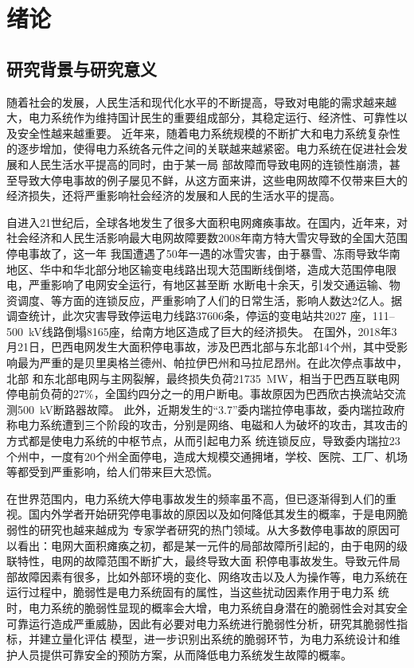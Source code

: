 \chapter{绪论}

\section{研究背景与研究意义}
\label{sec:research_background}
随着社会的发展，人民生活和现代化水平的不断提高，导致对电能的需求越来越大，电力系统作为维持国计民生的重要组成部分，其稳定运行、经济性、可靠性以及安全性越来越重要。
近年来，随着电力系统规模的不断扩大和电力系统复杂性的逐步增加，使得电力系统各元件之间的关联越来越紧密。电力系统在促进社会发展和人民生活水平提高的同时，由于某一局
部故障而导致电网的连锁性崩溃，甚至导致大停电事故的例子屡见不鲜，从这方面来讲，这些电网故障不仅带来巨大的经济损失，还将严重影响社会经济的发展和人民的生活水平的提高。

自进入21世纪后，全球各地发生了很多大面积电网瘫痪事故。在国内，近年来，对社会经济和人民生活影响最大电网故障要数2008年南方特大雪灾导致的全国大范围停电事故了，这一年
我国遭遇了50年一遇的冰雪灾害，由于暴雪、冻雨导致华南地区、华中和华北部分地区输变电线路出现大范围断线倒塔，造成大范围停电限电，严重影响了电网安全运行，有地区甚至断
水断电十余天，引发交通运输、物资调度、等方面的连锁反应，严重影响了人们的日常生活，影响人数达2亿人。据调查统计，此次灾害导致停运电力线路37606条，停运的变电站共2027
座，111--500~kV线路倒塌8165座，给南方地区造成了巨大的经济损失。
在国外，2018年3月21日，巴西电网发生大面积停电事故，涉及巴西北部与东北部14个州，其中受影响最为严重的是贝里奥格兰德州、帕拉伊巴州和马拉尼昂州。在此次停点事故中，北部
和东北部电网与主网裂解，最终损失负荷21735~MW，相当于巴西互联电网停电前负荷的27\%，全国约四分之一的用户断电。事故原因为巴西欣古换流站交流测500~kV断路器故障\cite{refs1}。
此外，近期发生的“3.7”委内瑞拉停电事故，委内瑞拉政府称电力系统遭到三个阶段的攻击，分别是网络、电磁和人为破坏的攻击，其攻击的方式都是使电力系统的中枢节点，从而引起电力系
统连锁反应，导致委内瑞拉23个州中，一度有20个州全面停电，造成大规模交通拥堵，学校、医院、工厂、机场等都受到严重影响，给人们带来巨大恐慌。

在世界范围内，电力系统大停电事故发生的频率虽不高，但已逐渐得到人们的重视。国内外学者开始研究停电事故的原因以及如何降低其发生的概率，于是电网脆弱性的研究也越来越成为
专家学者研究的热门领域。从大多数停电事故的原因可以看出：电网大面积瘫痪之初，都是某一元件的局部故障所引起的，由于电网的级联特性，电网的故障范围不断扩大，最终导致大面
积停电事故发生。导致元件局部故障因素有很多，比如外部环境的变化、网络攻击以及人为操作等，电力系统在运行过程中，脆弱性是电力系统固有的属性，当这些扰动因素作用于电力系
统时，电力系统的脆弱性显现的概率会大增，电力系统自身潜在的脆弱性会对其安全可靠运行造成严重威胁，因此有必要对电力系统进行脆弱性分析，研究其脆弱性指标，并建立量化评估
模型，进一步识别出系统的脆弱环节，为电力系统设计和维护人员提供可靠安全的预防方案，从而降低电力系统发生故障的概率。
